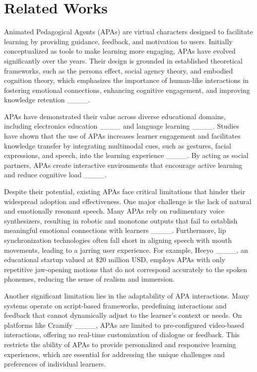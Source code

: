 \section{Related Works}
Animated Pedagogical Agents (APAs) are virtual characters designed to facilitate learning by providing guidance, feedback, and motivation to users. Initially conceptualized as tools to make learning more engaging, APAs have evolved significantly over the years. Their design is grounded in established theoretical frameworks, such as the persona effect, social agency theory, and embodied cognition theory, which emphasizes the importance of human-like interactions in fostering emotional connections, enhancing cognitive engagement, and improving knowledge retention ____.

APAs have demonstrated their value across diverse educational domains, including electronics education ____ and language learning ____. Studies have shown that the use of APAs increases learner engagement and facilitates knowledge transfer by integrating multimodal cues, such as gestures, facial expressions, and speech, into the learning experience ____. By acting as social partners, APAs create interactive environments that encourage active learning and reduce cognitive load ____.

Despite their potential, existing APAs face critical limitations that hinder their widespread adoption and effectiveness. One major challenge is the lack of natural and emotionally resonant speech. Many APAs rely on rudimentary voice synthesizers, resulting in robotic and monotone outputs that fail to establish meaningful emotional connections with learners ____. Furthermore, lip synchronization technologies often fall short in aligning speech with mouth movements, leading to a jarring user experience. For example, Heeyo ____, an educational startup valued at \$20 million USD, employs APAs with only repetitive jaw-opening motions that do not correspond accurately to the spoken phonemes, reducing the sense of realism and immersion.

Another significant limitation lies in the adaptability of APA interactions. Many systems operate on script-based frameworks, predefining interactions and feedback that cannot dynamically adjust to the learner’s context or needs. On platforms like Cramify ____, APAs are limited to pre-configured video-based interactions, offering no real-time customization of dialogue or feedback. This restricts the ability of APAs to provide personalized and responsive learning experiences, which are essential for addressing the unique challenges and preferences of individual learners.

